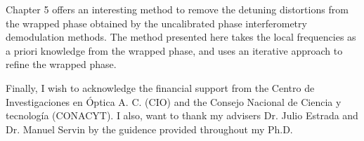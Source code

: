 Chapter 5 offers an interesting method to remove the detuning distortions from 
the wrapped phase obtained by the uncalibrated phase interferometry demodulation 
methods. The method presented here takes the local frequencies as a priori 
knowledge from the wrapped phase, and uses an iterative approach to refine the 
wrapped phase.

Finally, I wish to acknowledge the financial support from the Centro de 
Investigaciones en \'Optica A. C. (CIO) and the Consejo Nacional de Ciencia y 
tecnolog\'ia (CONACYT). I also, want to thank my advisers Dr. Julio Estrada and
Dr. Manuel Servin by the guidence provided throughout my Ph.D.
